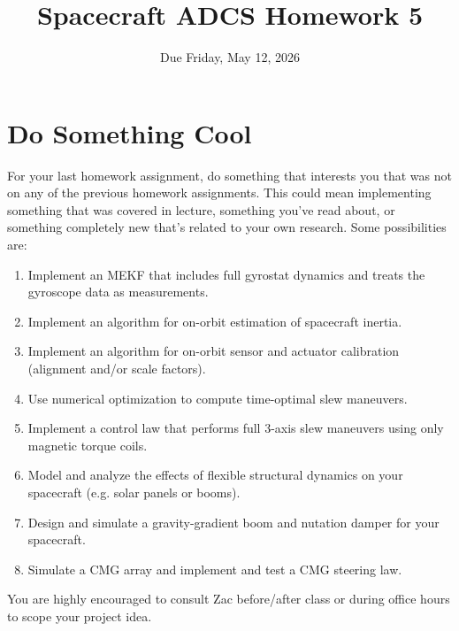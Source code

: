 \documentclass[11pt,letterpaper]{article}
\title{Spacecraft ADCS Homework 5}
\author{Due Friday, May 12, 2026}
\date{}
\begin{document}
\maketitle

\section{Do Something Cool}

For your last homework assignment, do something that interests you that was not on any of the previous homework assignments. This could mean implementing something that was covered in lecture, something you've read about, or something completely new that's related to your own research. Some possibilities are:
\begin{enumerate}
	\item Implement an MEKF that includes full gyrostat dynamics and treats the gyroscope data as measurements.
	\item Implement an algorithm for on-orbit estimation of spacecraft inertia.
	\item Implement an algorithm for on-orbit sensor and actuator calibration (alignment and/or scale factors).
	\item Use numerical optimization to compute time-optimal slew maneuvers.
	\item Implement a control law that performs full 3-axis slew maneuvers using only magnetic torque coils.
	\item Model and analyze the effects of flexible structural dynamics on your spacecraft (e.g. solar panels or booms).
	\item Design and simulate a gravity-gradient boom and nutation damper for your spacecraft.
	\item Simulate a CMG array and implement and test a CMG steering law.
\end{enumerate}


\noindent You are highly encouraged to consult Zac before/after class or during office hours to scope your project idea.
\end{document}
